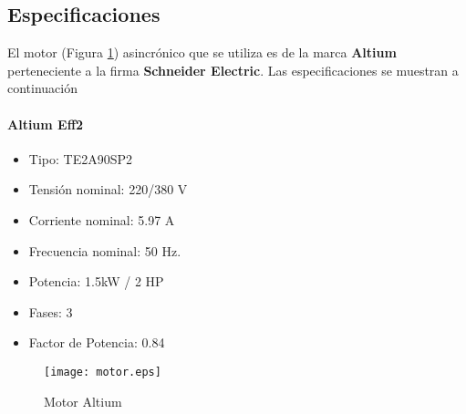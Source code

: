 \subsection{Especificaciones}

	El motor (Figura \ref{fig:motor}) asincrónico que se utiliza es de la marca \textbf{Altium} perteneciente a la firma \textbf{Schneider Electric}. Las especificaciones se muestran a continuación \\
	\paragraph*{Altium Eff2}
	\begin{itemize}
		\item 	Tipo: TE2A90SP2
		\item   Tensión nominal: 220/380 V
		\item 	Corriente nominal: 5.97 A 
		\item	Frecuencia nominal:  50 Hz.
		\item 	Potencia: 1.5kW / 2 HP
		\item 	Fases: 3
		\item   Factor de Potencia: 0.84
	\end{itemize}
	\newpage
	\begin{figure}[h!]
		\centering
		\texttt{[image: motor.eps]}
		\caption{Motor Altium}
		\label{fig:motor}
	\end{figure}
	\newpage